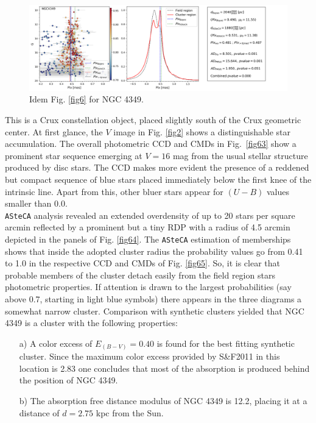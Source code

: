 \documentclass[draft]{aa}
\begin{document}
\begin{figure}[ht]
    \centering
    \includegraphics[width=\hsize]{../figs/plx_NGC4349.png}
    \caption{Idem Fig. \ref{fig6} for NGC 4349.}
    \label{fig66}
\end{figure}


This is a Crux constellation object, placed slightly south of the Crux geometric
center. At first glance, the $V$ image in Fig. \ref{fig2} shows a
distinguishable star accumulation. The overall photometric CCD and CMDs in
Fig.~\ref{fig63} show a prominent star sequence emerging at $V=16$ mag from the
usual stellar structure produced by disc stars. The CCD makes more evident the
presence of a reddened but compact sequence of blue stars placed immediately
below the first knee of the intrinsic line. Apart from this, other bluer stars
appear for $(U-B)$ values smaller than 0.0.\\ 

\texttt{ASteCA} analysis revealed an extended overdensity of up to 20 stars per
square arcmin reflected by a prominent but a tiny RDP with a radius of 4.5
arcmin depicted in the panels of Fig. \ref{fig64}.
The \texttt{ASteCA} estimation of memberships shows that inside the adopted
cluster radius the probability values go from 0.41 to 1.0 in the respective
CCD and CMDs of Fig. \ref{fig65}. So, it is clear that probable members of the
cluster detach easily from the field region stars photometric properties. If
attention is drawn to the largest probabilities (say above 0.7, starting in
light blue symbols) there appears in the three diagrams a somewhat narrow
cluster. Comparison with synthetic clusters yielded that NGC 4349 is a cluster
with the following properties:

\begin{itemize}
    \item [a)] A color excess of $E_{(B-V)}= 0.40$ is found for the best fitting
    synthetic cluster. Since the maximum color excess provided by
    S\&F2011 in this location is 2.83 one concludes that most of the
    absorption is produced behind the position of NGC 4349.
    \item [b)] The absorption free distance modulus of NGC 4349 is 12.2,
    placing it at a distance of $d=2.75$ kpc from the Sun. 
\end{itemize}
\end{document}
